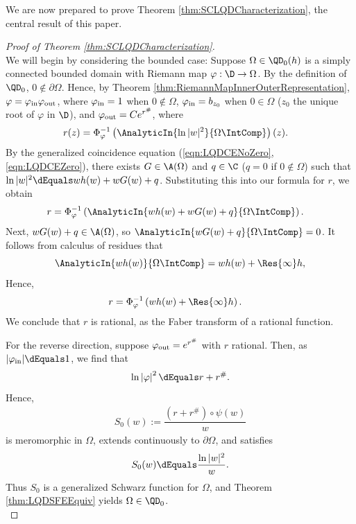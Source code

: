 \documentclass{article}
\numberwithin{equation}{section}
\begin{document}
\noindent We are now prepared to prove Theorem \ref{thm:SCLQDCharacterization}, the central result of this paper.
\begin{proof}[Proof of Theorem \ref{thm:SCLQDCharacterization}]\;\\
We will begin by considering the bounded case: Suppose $\Omega\in\QD_0(h)$ is a simply connected bounded domain with Riemann map $\varphi:\D\rightarrow\Omega$. By the definition of $\QD_0$, $0\notin\partial\Omega$. Hence, by Theorem \ref{thm:RiemannMapInnerOuterRepresentation}, $\varphi=\varphi_{\rm in}\varphi_{\rm out}$, where $\varphi_{\rm in}=1$ when $0\notin\Omega$, $\varphi_{\rm in}=b_{z_0}$ when $0\in\Omega$ ($z_0$ the unique root of $\varphi$ in $\D$), and $\varphi_{\rm out}=Ce^{r^{\#}}$, where
\begin{align*}
r(z)&=\Phi_{\varphi}^{-1}\left(\AnalyticIn{\ln|w|^2}{\Omega\IntComp}\right)(z).
\end{align*}
By the generalized coincidence equation (\ref{eqn:LQDCENoZero}, \ref{eqn:LQDCEZero}), there exists $G\in\A(\Omega)$ and $q\in\C$ ($q=0$ if $0\notin\Omega$) such that $\ln|w|^2\dEquals wh(w)+wG(w)+q$. Substituting this into our formula for $r$, we obtain
\begin{align*}
r&=\Phi_{\varphi}^{-1}\left(\AnalyticIn{wh(w)+wG(w)+q}{\Omega\IntComp}\right).
\end{align*}
Next, $wG(w)+q\in\A(\Omega)$, so $\AnalyticIn{wG(w)+q}{\Omega\IntComp}=0$. It follows from calculus of residues that
$$\AnalyticIn{wh(w)}{\Omega\IntComp}=wh(w)+\Res{\infty}h,$$
Hence,
\begin{align*}
r&=\Phi_{\varphi}^{-1}\left(wh(w)+\Res{\infty}h\right).
\end{align*}
We conclude that $r$ is rational, as the Faber transform of a rational function.

For the reverse direction, suppose $\varphi_{\rm out}=e^{r^{\#}}$ with $r$ rational. Then, as $|\varphi_{\rm in}|\dEquals1$, we find that
$$\ln\left|\varphi\right|^{2}\dEquals r+r^{\#}.$$
Hence,
\begin{align*}
    S_0(w):=\dfrac{\left(r+r^{\#}\right)\circ\psi(w)}{w}
\end{align*}
is meromorphic in $\Omega$, extends continuously to $\partial\Omega$, and satisfies
$$S_0(w)\dEquals\dfrac{\ln|w|^2}{w}.$$
Thus $S_0$ is a generalized Schwarz function for $\Omega$, and Theorem \ref{thm:LQDSFEEquiv} yields $\Omega\in\QD_0$.\\


\end{proof}
\end{document}
